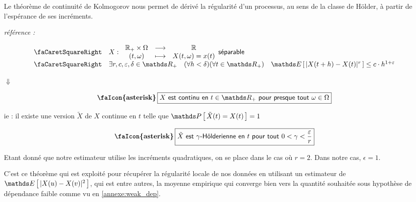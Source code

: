 Le théorème de continuité de Kolmogorov nous permet de dérivé la régularité d'un processus, au sens de la classe de Hölder, à partir de l'espérance de ses incréments.

\begin{thm}
	\emph{référence : } ~\cite[thm : 2.197 | page : 145]{capasso2015introduction}

	\begin{equation*}
		\begin{array}{ll}
			\textsf{\faCaretSquareRight}
			 & X : \, \begin{array}{ccc}
				          \mathbb{R_+} \times \Omega & \longrightarrow & \mathbb{R}          \\
				          (t, \omega)                & \longmapsto     & X(t, \omega) = x(t)
			          \end{array} \textsf{séparable}
			\\
			\textsf{\faCaretSquareRight}
			 & \exists r,c, \varepsilon, \delta \in \mathds R_+ \quad (\forall h < \delta)(\forall t \in \mathds R_+)  \quad \esperance{ | X(t+h) - X(t) |^r } \leq c\cdot h^{1+\varepsilon}
		\end{array}
	\end{equation*}

	\begin{center}
		$\Downarrow$
	\end{center}
	\begin{equation*}
		\textbf{\faIcon{asterisk}}\, \boxed{
			X \textsf{ est continu en } t \in \mathds R_+ \textsf{ pour presque tout } \omega \in \Omega
		}
	\end{equation*}
	\begin{center}
		ie : il existe une version $\tilde X$ de $X$ continue en $t$ telle que $\proba{ \tilde X(t) = X(t)} = 1$
	\end{center}

	\begin{equation*}
		\textbf{\faIcon{asterisk}} \, \boxed{
			\tilde{X} \textsf{ est } \gamma \textsf{-Hölderienne en } t  \textsf{ pour tout } 0 < \gamma < \frac{\varepsilon}{r}
		}
	\end{equation*}
	\label{thm:kolmogorov_continuite}
\end{thm}

Etant donné que notre estimateur utilise les incréments quadratiques, on se place dans le cas où $r = 2$. Dans notre cas, $\epsilon = 1$.

\largeskip

C'est ce théorème qui est exploité pour récupérer la régularité locale de nos données en utilisant un estimateur de $\esperance{ |X(u) - X(v)|^2}$, qui est entre autres, la moyenne empirique qui converge bien vers la quantité souhaitée sous hypothèse de dépendance faible comme vu en \ref{annexe:weak_dep}.